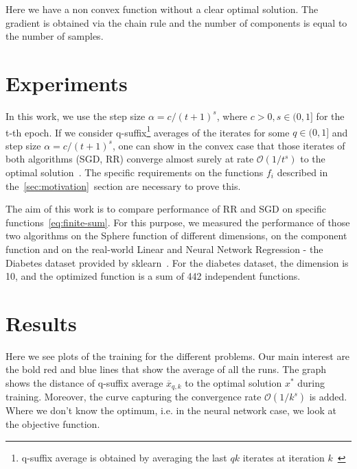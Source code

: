 \documentclass[10pt,conference,compsocconf]{IEEEtran}
\begin{document}
Here we have a non convex function without a clear optimal solution. The gradient is obtained via the chain rule and the number of components is equal to the number of samples. 


\section{Experiments}


\medskip

In this work, we use the step size $\alpha = c / (t+1)^s$, where $c>0, s \in (0, 1]$ for the t-th epoch. If we consider q-suffix\footnote{q-suffix
average is obtained by averaging the last $qk$ iterates at iteration
$k$~\cite{COMPONENTFUNCTION}} averages of the iterates for some $q \in (0,1]$
and step size $\alpha = c / (t+1)^s$, one can show in the convex case that those iterates of both algorithms (SGD, RR) converge almost surely  at rate
$\mathcal{O}(1 / t^s)$ to the optimal solution~\cite{COMPONENTFUNCTION}.
The specific requirements on the functions $f_i$ described in
the~\ref{sec:motivation}~section are necessary to prove this.


The aim of this work is to compare performance of RR and SGD on
specific functions~\ref{eq:finite-sum}. For this purpose, we measured the
performance of those two algorithms on the Sphere function of different
dimensions, on the component function and on the real-world
Linear and Neural Network Regression - the Diabetes dataset provided by
sklearn~\cite{DIABETES,SKLEARN}. For the diabetes dataset, the dimension
is 10, and the optimized function is a sum of 442 independent functions.

\section{Results}
Here we see plots of the training for the different problems. Our main interest are the bold red and blue lines that show the average of all the runs. The graph shows the distance of q-suffix average $\overline{x}_{q,k}$ to the optimal solution $x^*$ during training. Moreover, the curve capturing the convergence rate $\mathcal{O}(1 / k^s)$ is added. Where we don't know the optimum, i.e. in the neural network case, we look at the objective function. 
\end{document}
